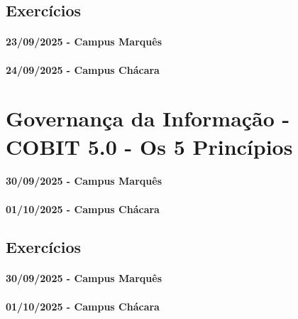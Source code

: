 \documentclass[
]{book}
\begin{document}
\section{Exercícios}\label{exercuxedcios-5}

\subsubsection*{23/09/2025 - Campus Marquês}\label{campus-marquuxeas-7}

\subsubsection*{24/09/2025 - Campus Chácara}\label{campus-chuxe1cara-7}

\chapter{Governança da Informação - COBIT 5.0 - Os 5 Princípios}\label{governanuxe7a-da-informauxe7uxe3o---cobit-5.0---os-5-princuxedpios}

\subsubsection*{30/09/2025 - Campus Marquês}\label{campus-marquuxeas-8}

\subsubsection*{01/10/2025 - Campus Chácara}\label{campus-chuxe1cara-8}

\section{Exercícios}\label{exercuxedcios-6}

\subsubsection*{30/09/2025 - Campus Marquês}\label{campus-marquuxeas-9}

\subsubsection*{01/10/2025 - Campus Chácara}\label{campus-chuxe1cara-9}
\end{document}
